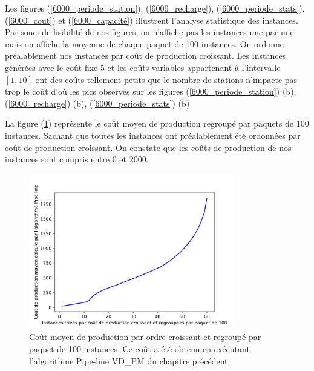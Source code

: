 Les figures (\ref{6000_periode_station}), (\ref{6000_recharge}), (\ref{6000_periode_stats}), (\ref{6000_cout}) et (\ref{6000_capacité}) illustrent l'analyse statistique des instances. Par souci de lisibilité de nos figures, on n'affiche pas les instances une par une mais on affiche la moyenne de chaque paquet de 100 instances. On ordonne préalablement nos instances par coût de production croissant.  Les instances générées avec le coût  fixe 5 et les coûts variables appartenant à l'intervalle $[1,10]$ ont des coûts tellement petits que le nombre de stations n'impacte pas trop le coût d'où les pics observés sur les figures (\ref{6000_periode_station}) (b), (\ref{6000_recharge}) (b), (\ref{6000_periode_stats}) (b)

La figure (\ref{coutprod}) représente le coût moyen de production regroupé par paquets de 100 instances. Sachant que toutes les instances ont préalablement été ordonnées par coût de production croissant. On constate que les coûts de production de nos instances sont compris entre 0 et 2000.
\begin{figure}[H]
	\centerline{
		\includegraphics[width=9cm]{images_these/Stats_instances_coutopt.pdf}}
	\caption[Coût moyen de production par ordre croissant et regroupé par paquet de 100 instances]{ Coût moyen de production par ordre croissant et regroupé par paquet de 100 instances. Ce coût a été obtenu en exécutant l'algorithme Pipe-line VD\_PM du chapitre précédent. }\label{coutprod}
\end{figure}

